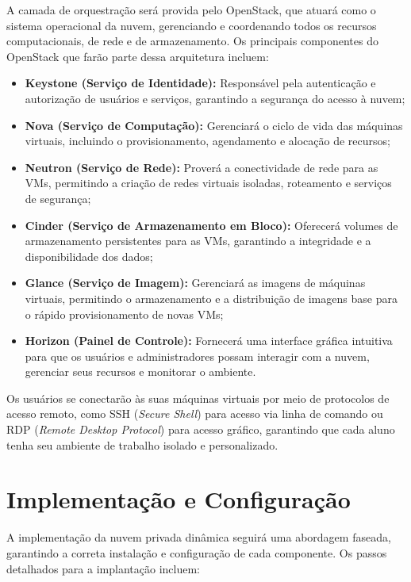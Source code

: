 A camada de orquestração será provida pelo OpenStack, que atuará como o sistema operacional da nuvem, gerenciando e coordenando todos os recursos computacionais, de rede e de armazenamento. Os principais componentes do OpenStack que farão parte dessa arquitetura incluem:

\begin{itemize}
 \item \textbf{Keystone (Serviço de Identidade):} Responsável pela autenticação e autorização de usuários e serviços, garantindo a segurança do acesso à nuvem;
 \item \textbf{Nova (Serviço de Computação):} Gerenciará o ciclo de vida das máquinas virtuais, incluindo o provisionamento, agendamento e alocação de recursos;
 \item \textbf{Neutron (Serviço de Rede):} Proverá a conectividade de rede para as VMs, permitindo a criação de redes virtuais isoladas, roteamento e serviços de segurança;
 \item \textbf{Cinder (Serviço de Armazenamento em Bloco):} Oferecerá volumes de armazenamento persistentes para as VMs, garantindo a integridade e a disponibilidade dos dados;
 \item \textbf{Glance (Serviço de Imagem):} Gerenciará as imagens de máquinas virtuais, permitindo o armazenamento e a distribuição de imagens base para o rápido provisionamento de novas VMs;
 \item \textbf{Horizon (Painel de Controle):} Fornecerá uma interface gráfica intuitiva para que os usuários e administradores possam interagir com a nuvem, gerenciar seus recursos e monitorar o ambiente.
\end{itemize}

Os usuários se conectarão às suas máquinas virtuais por meio de protocolos de acesso remoto, como SSH (\textit{Secure Shell}) para acesso via linha de comando ou RDP (\textit{Remote Desktop Protocol}) para acesso gráfico, garantindo que cada aluno tenha seu ambiente de trabalho isolado e personalizado.

\section{Implementação e Configuração}

A implementação da nuvem privada dinâmica seguirá uma abordagem faseada, garantindo a correta instalação e configuração de cada componente. Os passos detalhados para a implantação incluem:

